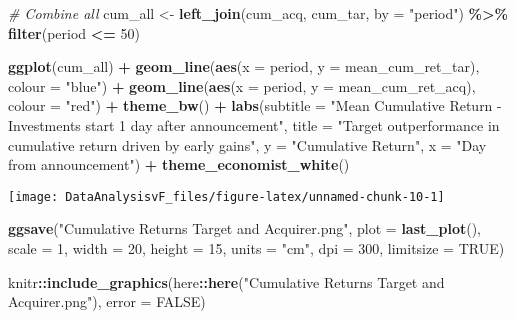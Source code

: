 \documentclass[
]{article}
\newenvironment{Shaded}{\begin{snugshade}}{\end{snugshade}}
\newcommand{\CommentTok}[1]{\textcolor[rgb]{0.56,0.35,0.01}{\textit{#1}}}
\newcommand{\DataTypeTok}[1]{\textcolor[rgb]{0.13,0.29,0.53}{#1}}
\newcommand{\DecValTok}[1]{\textcolor[rgb]{0.00,0.00,0.81}{#1}}
\newcommand{\KeywordTok}[1]{\textcolor[rgb]{0.13,0.29,0.53}{\textbf{#1}}}
\newcommand{\NormalTok}[1]{#1}
\newcommand{\OperatorTok}[1]{\textcolor[rgb]{0.81,0.36,0.00}{\textbf{#1}}}
\newcommand{\OtherTok}[1]{\textcolor[rgb]{0.56,0.35,0.01}{#1}}
\newcommand{\StringTok}[1]{\textcolor[rgb]{0.31,0.60,0.02}{#1}}
\begin{document}
\begin{Shaded}
\begin{Highlighting}[]
\CommentTok{\# Combine all}
\NormalTok{cum\_all \textless{}{-}}\StringTok{ }\KeywordTok{left\_join}\NormalTok{(cum\_acq, cum\_tar, }\DataTypeTok{by =} \StringTok{"period"}\NormalTok{) }\OperatorTok{\%\textgreater{}\%}
\StringTok{  }\KeywordTok{filter}\NormalTok{(period }\OperatorTok{\textless{}=}\StringTok{ }\DecValTok{50}\NormalTok{)}
  

\KeywordTok{ggplot}\NormalTok{(cum\_all) }\OperatorTok{+}
\StringTok{  }
\StringTok{  }\KeywordTok{geom\_line}\NormalTok{(}\KeywordTok{aes}\NormalTok{(}\DataTypeTok{x =}\NormalTok{ period, }\DataTypeTok{y =}\NormalTok{ mean\_cum\_ret\_tar), }\DataTypeTok{colour =} \StringTok{"blue"}\NormalTok{) }\OperatorTok{+}
\StringTok{  }\KeywordTok{geom\_line}\NormalTok{(}\KeywordTok{aes}\NormalTok{(}\DataTypeTok{x =}\NormalTok{ period, }\DataTypeTok{y =}\NormalTok{ mean\_cum\_ret\_acq), }\DataTypeTok{colour =} \StringTok{"red"}\NormalTok{) }\OperatorTok{+}
\StringTok{  }\KeywordTok{theme\_bw}\NormalTok{() }\OperatorTok{+}
\StringTok{  }\KeywordTok{labs}\NormalTok{(}\DataTypeTok{subtitle =} \StringTok{"Mean Cumulative Return {-} Investments start 1 day after announcement"}\NormalTok{,}
       \DataTypeTok{title =} \StringTok{"Target outperformance in cumulative return driven by early gains"}\NormalTok{,}
       \DataTypeTok{y =} \StringTok{"Cumulative Return"}\NormalTok{,}
       \DataTypeTok{x =} \StringTok{"Day from announcement"}\NormalTok{) }\OperatorTok{+}\StringTok{ }
\StringTok{  }\KeywordTok{theme\_economist\_white}\NormalTok{()}
\end{Highlighting}
\end{Shaded}

\begin{center}\texttt{[image: DataAnalysisvF\_files/figure-latex/unnamed-chunk-10-1]} \end{center}

\begin{Shaded}
\begin{Highlighting}[]
\KeywordTok{ggsave}\NormalTok{(}\StringTok{"Cumulative Returns Target and Acquirer.png"}\NormalTok{,}
       \DataTypeTok{plot =} \KeywordTok{last\_plot}\NormalTok{(),}
       \DataTypeTok{scale =} \DecValTok{1}\NormalTok{,}
       \DataTypeTok{width =} \DecValTok{20}\NormalTok{,}
       \DataTypeTok{height =} \DecValTok{15}\NormalTok{,}
       \DataTypeTok{units =} \StringTok{"cm"}\NormalTok{,}
       \DataTypeTok{dpi =} \DecValTok{300}\NormalTok{,}
       \DataTypeTok{limitsize =} \OtherTok{TRUE}\NormalTok{)}

\NormalTok{knitr}\OperatorTok{::}\KeywordTok{include\_graphics}\NormalTok{(here}\OperatorTok{::}\KeywordTok{here}\NormalTok{(}\StringTok{"Cumulative Returns Target and Acquirer.png"}\NormalTok{), }\DataTypeTok{error =} \OtherTok{FALSE}\NormalTok{)}
\end{Highlighting}
\end{Shaded}
\end{document}
